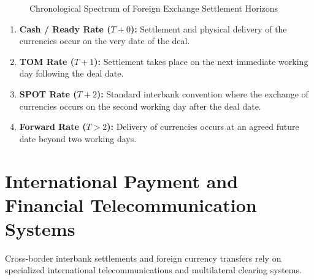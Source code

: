\begin{figure}[htbp]
{%
    }
    \caption{Chronological Spectrum of Foreign Exchange Settlement Horizons}
    \label{fig:settlement_horizons}
\end{figure}

\begin{enumerate}[leftmargin=*]
    \item \textbf{Cash / Ready Rate ($T+0$):} Settlement and physical delivery of the currencies occur on the very date of the deal.
    \item \textbf{TOM Rate ($T+1$):} Settlement takes place on the next immediate working day following the deal date.
    \item \textbf{SPOT Rate ($T+2$):} Standard interbank convention where the exchange of currencies occurs on the second working day after the deal date.
    \item \textbf{Forward Rate ($T > 2$):} Delivery of currencies occurs at an agreed future date beyond two working days.
\end{enumerate}

\section{International Payment and Financial Telecommunication Systems}

Cross-border interbank settlements and foreign currency transfers rely on specialized international telecommunications and multilateral clearing systems.

